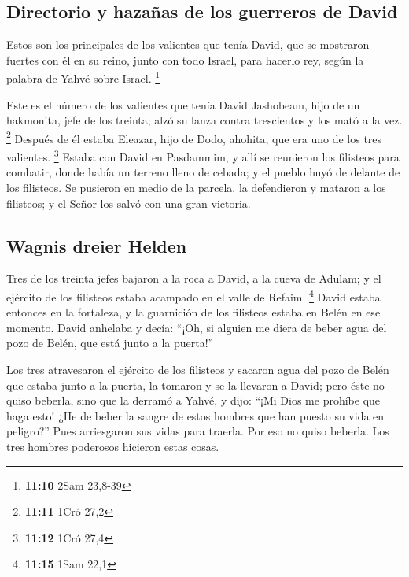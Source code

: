 \hypertarget{directorio-y-hazauxf1as-de-los-guerreros-de-david}{%
\subsection{Directorio y hazañas de los guerreros de
David}\label{directorio-y-hazauxf1as-de-los-guerreros-de-david}}

 Estos son los principales de los valientes que tenía
David, que se mostraron fuertes con él en su reino, junto con todo
Israel, para hacerlo rey, según la palabra de Yahvé sobre Israel.
\footnote{\textbf{11:10} 2Sam 23,8-39}

 Este es el número de los valientes que tenía David
Jashobeam, hijo de un hakmonita, jefe de los treinta; alzó su lanza
contra trescientos y los mató a la vez. \footnote{\textbf{11:11} 1Cró
  27,2}  Después de él estaba Eleazar, hijo de Dodo,
ahohita, que era uno de los tres valientes. \footnote{\textbf{11:12}
  1Cró 27,4}  Estaba con David en Pasdammim, y allí se
reunieron los filisteos para combatir, donde había un terreno lleno de
cebada; y el pueblo huyó de delante de los filisteos.  Se
pusieron en medio de la parcela, la defendieron y mataron a los
filisteos; y el Señor los salvó con una gran victoria.

\hypertarget{wagnis-dreier-helden}{%
\subsection{Wagnis dreier Helden}\label{wagnis-dreier-helden}}

 Tres de los treinta jefes bajaron a la roca a David, a
la cueva de Adulam; y el ejército de los filisteos estaba acampado en el
valle de Refaim. \footnote{\textbf{11:15} 1Sam 22,1} 
David estaba entonces en la fortaleza, y la guarnición de los filisteos
estaba en Belén en ese momento.  David anhelaba y decía:
``¡Oh, si alguien me diera de beber agua del pozo de Belén, que está
junto a la puerta!''

 Los tres atravesaron el ejército de los filisteos y
sacaron agua del pozo de Belén que estaba junto a la puerta, la tomaron
y se la llevaron a David; pero éste no quiso beberla, sino que la
derramó a Yahvé,  y dijo: ``¡Mi Dios me prohíbe que haga
esto! ¿He de beber la sangre de estos hombres que han puesto su vida en
peligro?'' Pues arriesgaron sus vidas para traerla. Por eso no quiso
beberla. Los tres hombres poderosos hicieron estas cosas.

